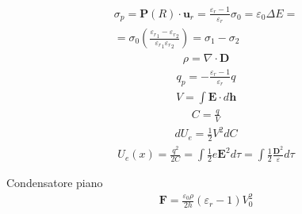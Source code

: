 \documentclass[10pt, twocolumn, a4paper, fleqn]{article}
\def\bb{\mathbf}
\def\e{\varepsilon}
\def\ke{{\varepsilon_r}}
\def\E{\bb{E}}
\def\P{\bb{P}}
\def\D{\bb{D}}
\def\F{\bb{F}}
\def\u{\bb{u}}
\begin{document}
\begin{equation*}\begin{split}
\sigma_p=\P\left(R\right)\cdot \u_r=\frac{\ke-1}{\ke}\sigma_0=\e_0\Delta E=\\
=\sigma_0\left(\frac{\ke_1-\ke_2}{\ke_1\ke_2}\right)=\sigma_1-\sigma_2
\end{split}\end{equation*}
\begin{equation*}\begin{split}
\rho=\nabla \cdot \D
\end{split}\end{equation*}
\begin{equation*}\begin{split}
q_p=-\frac{\ke-1}{\ke}q
\end{split}\end{equation*}
\begin{equation*}\begin{split}
V=\int{\E\cdot d\bb{h}}
\end{split}\end{equation*}
\begin{equation*}\begin{split}
C=\frac{q}{V}
\end{split}\end{equation*}
\begin{equation*}\begin{split}
dU_e=\frac{1}{2}V^2dC
\end{split}\end{equation*}
\begin{equation*}\begin{split}
U_e\left(x\right)=\frac{q^2}{2C}=\int{\frac{1}{2}e\E^2 d\tau}=\int{\frac{1}{2}\frac{\D^2}{\e}d\tau}
\end{split}\end{equation*}

Condensatore piano
\begin{equation*}\begin{split}
\F=\frac{\e_0\rho}{2h}\left(\ke-1\right)V_0^2
\end{split}\end{equation*}
\end{document}
